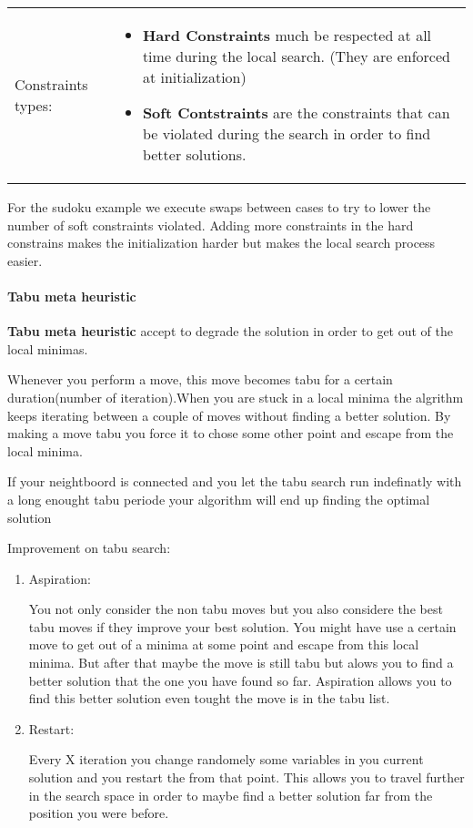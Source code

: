 \begin{tabular}{m{3cm}m{11cm}}
    Constraints types: 
    &
    \begin{itemize}
        \item \textbf{Hard Constraints} much be respected at all
            time during the local search. (They are enforced at
            initialization)

        \item \textbf{Soft Contstraints} are the constraints that
            can be violated during the search in order to find
            better solutions.
    \end{itemize}
\end{tabular}

For the sudoku example we execute swaps between cases to try to
lower the number of soft constraints violated. Adding more
constraints in the hard constrains makes the initialization
harder but makes the local search process easier.

\paragraph{Tabu meta heuristic}

\textbf{Tabu meta heuristic} accept to degrade the solution in order to get out of the local minimas.\newline

Whenever you perform a move, this move becomes tabu for a certain duration(number of iteration).When you are stuck in a local minima the algrithm keeps iterating between a couple of moves without finding a better solution. By making a move tabu you force it to chose some other point and escape from the  local minima.\newline

If your neightboord is connected and you let the tabu search run indefinatly with a long enought tabu periode your algorithm will end up finding the optimal solution

Improvement on tabu search:
\begin{enumerate}
    \item Aspiration: 

        You not only consider the non tabu moves but you also considere the best
        tabu moves if they improve your best solution. You might have use a
        certain move to get out of a minima at some point and escape from this
        local minima. But after that maybe the move is still tabu but alows you
        to find a better solution that the one you have found so far. Aspiration
        allows you to find this better solution even tought the move is in the
        tabu list.

    \item Restart:

        Every X iteration you change randomely some variables in you current
        solution and you restart the from that point. This allows you to travel
        further in the search space in order to maybe find a better solution far
        from the position you were before.
\end{enumerate}


